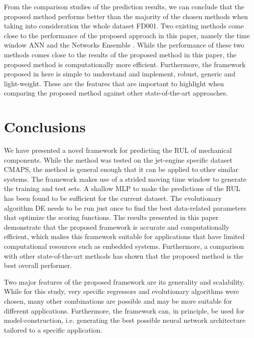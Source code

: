 \documentclass[12pt]{IEEEtran}%
\begin{document}
From the comparison studies of the prediction results, we can conclude that
the proposed method performs better than the majority of the chosen methods
when taking into consideration the whole dataset FD001. Two existing methods
come close to the performance of the proposed approach in this paper, namely
the time window ANN \cite{Lim2016} and the Networks Ensemble \cite{Zhang2016}.
While the performance of these two methods comes close to the results of the
proposed method in this paper, the proposed method is computationally more
efficient. Furthermore, the framework proposed in here is simple to understand
and implement, robust, generic and light-weight. These are the features that
are important to highlight when comparing the proposed method against other
state-of-the-art approaches.

\section{Conclusions}

\label{sec:conclusions}

We have presented a novel framework for predicting the RUL of mechanical
components. While the method was tested on the jet-engine specific dataset
CMAPS, the method is general enough that it can be applied to other similar
systems. The framework makes use of a strided moving time window to generate
the training and test sets. A shallow MLP to make the predictions of the RUL
has been found to be sufficient for the current dataset. The evolutionary
algorithm DE needs to be run just once to find the best data-related
parameters that optimize the scoring functions. The results presented in this
paper demonstrate that the proposed framework is accurate and computationally
efficient, which makes this framework suitable for applications that have
limited computational resources such as embedded systems. Furthermore, a
comparison with other state-of-the-art methods has shown that the proposed
method is the best overall performer.

Two major features of the proposed framework are its generality and
scalability. While for this study, very specific regressors and evolutionary
algorithms were chosen, many other combinations are possible and may be more
suitable for different applications. Furthermore, the framework can, in
principle, be used for model-construction, i.e. generating the best possible
neural network architecture tailored to a specific application.



%
\end{document}
